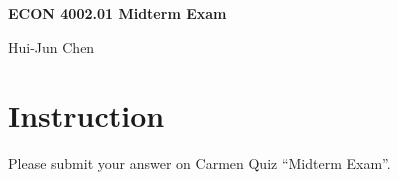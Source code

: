 \documentclass[14pt]{extarticle}
\newcommand{\red}[1]{\textcolor{red}{#1}}
\newcommand{\showAns}{\setboolean{showAns}{true}}
\begin{document}
\centerline{\huge\bf ECON 4002.01 Midterm Exam}
\smallskip
\centerline{\LARGE Hui-Jun Chen}

\medskip


\section*{Instruction}
\label{sec:Instruction}
Please submit your answer on Carmen Quiz ``Midterm Exam''.




\end{document}
